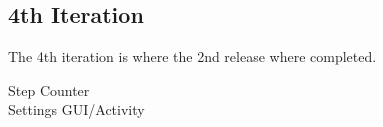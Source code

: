 \subsection{4th Iteration}
The 4th iteration is where the 2nd release where completed.

Step Counter \\
Settings GUI/Activity
